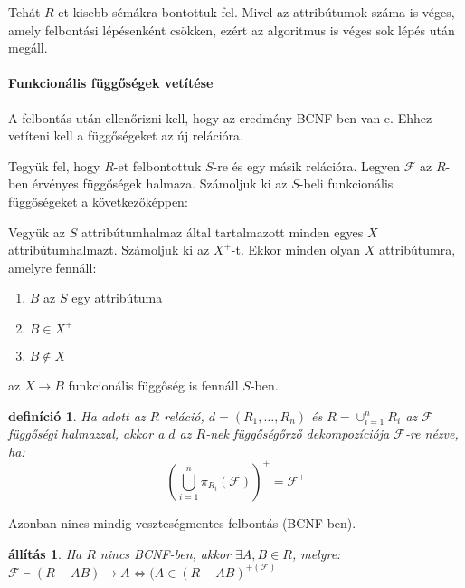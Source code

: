 \documentclass[fleqn,10pt,a4paper]{article}
\newcommand{\di}{\displaystyle}
\newcommand{\F}{\mathcal{F}}
\theoremstyle{magyar}
\newtheorem{de}{definíció}[section]
\newtheorem{al}{állítás}[section]
\begin{document}
  Tehát $R$-et kisebb sémákra bontottuk fel. Mivel az attribútumok száma is véges, amely felbontási lépésenként csökken,
  ezért az algoritmus is véges sok lépés után megáll.


  \paragraph{Funkcionális függőségek vetítése} A felbontás után ellenőrizni kell, hogy az eredmény BCNF-ben van-e. Ehhez
  vetíteni kell a függőségeket az új relációra.

  Tegyük fel, hogy $R$-et felbontottuk $S$-re és egy másik relációra. Legyen $\F$ az $R$-ben érvényes függőségek
  halmaza. Számoljuk ki az $S$-beli funkcionális függőségeket a következőképpen:
  
  Vegyük az $S$ attribútumhalmaz által tartalmazott minden egyes $X$ attribútumhalmazt. Számoljuk ki az $X^+$-t. Ekkor
  minden olyan $X$ attribútumra, amelyre fennáll:
  \begin{enumerate}
  \item $B$ az $S$ egy attribútuma
  \item $B \in X^+$
  \item $B \not\in X$      
  \end{enumerate}
  az $X\to B$ funkcionális függőség is fennáll $S$-ben.
  
  \begin{de} Ha adott az $R$ reláció, $d=(R_1,\ldots,R_n)$ és $R = \di\mathop{\cup}_{i=1}^n R_i$ az $\F$ függőségi
    halmazzal, akkor a $d$ az $R$-nek függőségőrző dekompozíciója $\F$-re nézve, ha:
    \[ \left(\bigcup_{i=1}^n \pi_{R_i}(\F)\right)^+ = \F^+\]    
  \end{de}

  \noindent Azonban nincs mindig veszteségmentes felbontás (BCNF-ben).

  
  \begin{al} Ha $R$ nincs BCNF-ben, akkor $\exists A,B\in R$, melyre: \\
    $\F \vdash (R-AB)\to A \iff (A\in (R-AB)^{+(\F)}$     
  \end{al}
\end{document}
